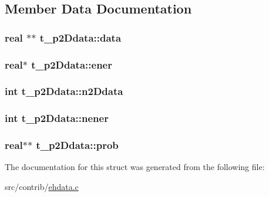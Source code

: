 \subsection{\-Member \-Data \-Documentation}
\hypertarget{structt__p2Ddata_a83103e01f406c050539612865259ce9a}{
\subsubsection[{data}]{\setlength{\rightskip}{0pt plus 5cm}real $\ast$$\ast$ {\bf t\-\_\-p2\-Ddata\-::data}}}\label{structt__p2Ddata_a83103e01f406c050539612865259ce9a}
\hypertarget{structt__p2Ddata_a0a58b28aa3a418cbf1035464e5ca567c}{
\subsubsection[{ener}]{\setlength{\rightskip}{0pt plus 5cm}real$\ast$ {\bf t\-\_\-p2\-Ddata\-::ener}}}\label{structt__p2Ddata_a0a58b28aa3a418cbf1035464e5ca567c}
\hypertarget{structt__p2Ddata_a36f4f0bed9d652c411a4469c95253b6f}{
\subsubsection[{n2\-Ddata}]{\setlength{\rightskip}{0pt plus 5cm}int {\bf t\-\_\-p2\-Ddata\-::n2\-Ddata}}}\label{structt__p2Ddata_a36f4f0bed9d652c411a4469c95253b6f}
\hypertarget{structt__p2Ddata_abaf7ca6bbd616815168c296c630b0448}{
\subsubsection[{nener}]{\setlength{\rightskip}{0pt plus 5cm}int {\bf t\-\_\-p2\-Ddata\-::nener}}}\label{structt__p2Ddata_abaf7ca6bbd616815168c296c630b0448}
\hypertarget{structt__p2Ddata_a07c49cd72a36afcf2f12cffc8935e27f}{
\subsubsection[{prob}]{\setlength{\rightskip}{0pt plus 5cm}real$\ast$$\ast$ {\bf t\-\_\-p2\-Ddata\-::prob}}}\label{structt__p2Ddata_a07c49cd72a36afcf2f12cffc8935e27f}


\-The documentation for this struct was generated from the following file\-:\begin{DoxyCompactItemize}
\item 
src/contrib/\hyperlink{ehdata_8c}{ehdata.\-c}\end{DoxyCompactItemize}
